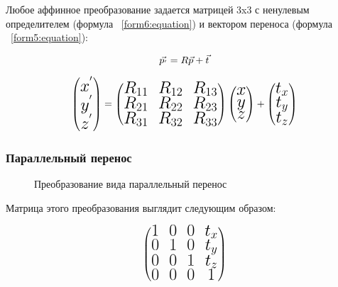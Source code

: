 Любое аффинное преобразование задается матрицей 3x3 с ненулевым определителем (формула ~\ref{form6:equation}) и вектором переноса (формула ~\ref{form5:equation}):

\begin{equation}
	\fontsize{17}{20}{
	\vec{p_{'}} = R\vec{p} + \vec{t}}
	\label{form5:equation}
\end{equation}

\begin{equation}
	\fontsize{17}{20}{
	\left(
	\begin{matrix}
		x^{'} \\
		y^{'} \\
		z^{'}
	\end{matrix}
	\right)
	=
	\left(
	\begin{matrix}
		R_{11} & R_{12} & R_{13}\\
		R_{21} & R_{22} & R_{23}\\
		R_{31} & R_{32} & R_{33}
	\end{matrix}
	\right)
	\left(
	\begin{matrix}
		x\\
		y\\
		z
	\end{matrix}
	\right)
	+
	\left(
	\begin{matrix}
		t_{x}\\
		t_{y}\\
		t_{z}
	\end{matrix}
	\right)}
	\label{form6:equation}
\end{equation}

\subsubsection{Параллельный перенос}
\begin{figure}[H]
	\caption{Преобразование вида параллельный перенос}
	\label{prim1:image}
\end{figure}

Матрица этого преобразования выглядит следующим образом:

\begin{equation}
	\fontsize{17}{20}{\left(
	\begin{matrix}
		1 & 0 & 0 & t_{x}\\
		0 & 1 & 0 & t_{y}\\
		0 & 0 & 1 & t_{z} \\
		0 & 0 & 0 & 1
	\end{matrix}
	\right)}
\end{equation}

